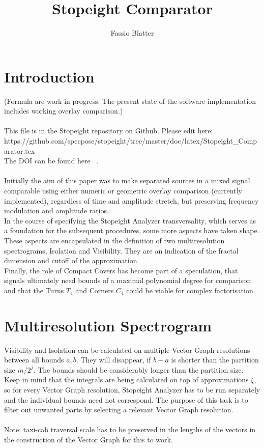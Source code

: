 \documentclass{report}
\begin{document}
\title{Stopeight Comparator}
\author{Fassio Blatter}
\maketitle

\chapter{Introduction}
(Formula are work in progress. The present state of the software implementation includes working overlay comparison.)\\\\
This file is in the Stopeight repository on Github. Please edit here:\\
https://github.com/specpose/stopeight/tree/master/doc/latex/Stopeight\_Comparator.tex\\
The DOI can be found here ~\cite{Analyzer}.\\\\
Initially the aim of this paper was to make separated sources in a mixed signal comparable using either numeric or geometric overlay comparison (currently implemented), regardless of time and amplitude stretch, but preserving frequency modulation and amplitude ratios.\\
In the course of specifying the Stopeight Analyzer transversality, which serves as a foundation for the subsequent procedures, some more aspects have taken shape. These aspects are encapsulated in the definition of two multiresolution spectrograms, Isolation and Visibility. They are an indication of the fractal dimension and cutoff of the approximation.\\
Finally, the role of Compact Covers has become part of a speculation, that signals ultimately need bounds of a maximal polynomial degree for comparison and that the Turns $T_{4}$ and Corners $C_{4}$ could be viable for complex factorisation.

\chapter{Multiresolution Spectrogram}
Visibility and Isolation can be calculated on multiple Vector Graph resolutions between all bounds $a,b$. They will disappear, if $b-a$ is shorter than the partition size $m/2^j$.
The bounds should be considerably longer than the partition size. Keep in mind that the integrals are being calculated on top of approximations $\xi$, so for every Vector Graph resolution, Stopeight Analyzer has to be run separately and the individual bounds need not correspond. The purpose of this task is to filter out unwanted parts by selecting a relevant Vector Graph resolution.\\\\
Note: taxi-cab traversal scale has to be preserved in the lengths of the vectors in the construction of the Vector Graph for this to work.
\end{document}

